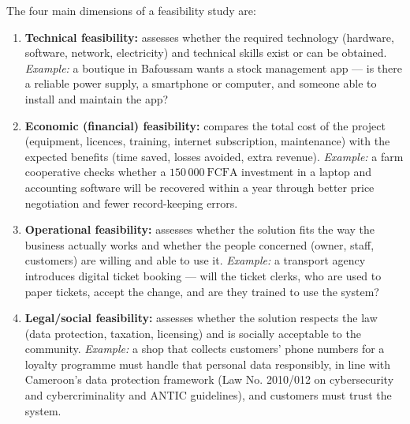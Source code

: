 \documentclass[11pt]{article}
\begin{document}
\begin{corrige}
The four main dimensions of a feasibility study are:

\begin{enumerate}
\item \textbf{Technical feasibility:} assesses whether the required technology (hardware, software, network, electricity) and technical skills exist or can be obtained. \emph{Example:} a boutique in Bafoussam wants a stock management app — is there a reliable power supply, a smartphone or computer, and someone able to install and maintain the app?
\item \textbf{Economic (financial) feasibility:} compares the total cost of the project (equipment, licences, training, internet subscription, maintenance) with the expected benefits (time saved, losses avoided, extra revenue). \emph{Example:} a farm cooperative checks whether a $150\,000\ \mathrm{FCFA}$ investment in a laptop and accounting software will be recovered within a year through better price negotiation and fewer record-keeping errors.
\item \textbf{Operational feasibility:} assesses whether the solution fits the way the business actually works and whether the people concerned (owner, staff, customers) are willing and able to use it. \emph{Example:} a transport agency introduces digital ticket booking — will the ticket clerks, who are used to paper tickets, accept the change, and are they trained to use the system?
\item \textbf{Legal/social feasibility:} assesses whether the solution respects the law (data protection, taxation, licensing) and is socially acceptable to the community. \emph{Example:} a shop that collects customers' phone numbers for a loyalty programme must handle that personal data responsibly, in line with Cameroon's data protection framework (Law No. 2010/012 on cybersecurity and cybercriminality and ANTIC guidelines), and customers must trust the system.
\end{enumerate}
\end{corrige}
\end{document}
